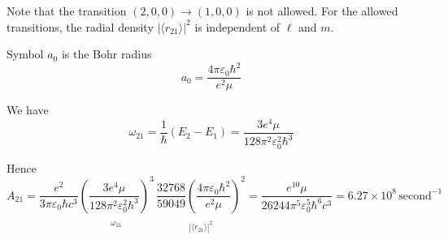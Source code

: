 \documentclass[12pt]{article}
\begin{document}
\bigskip
\noindent
Note that the transition $(2,0,0)\rightarrow(1,0,0)$ is not allowed.
For the allowed transitions, the radial density
$|\langle r_{21}\rangle|^2$ is independent of $\ell$ and $m$.

\bigskip
\noindent
Symbol $a_0$ is the Bohr radius
\begin{equation*}
a_0=\frac{4\pi\varepsilon_0\hbar^2}{e^2\mu}
\end{equation*}

\bigskip
\noindent
We have
\begin{equation*}
\omega_{21}=\frac{1}{\hbar}(E_2-E_1)=\frac{3e^4\mu}{128\pi^2\varepsilon_0^2\hbar^3}
\end{equation*}

\noindent
Hence
\begin{equation*}
A_{21}=\frac{e^2}{3\pi\varepsilon_0\hbar c^3}
\underset{\substack{\\[1ex]\omega_{21}}}
{\left(\frac{3e^4\mu}{128\pi^2\varepsilon_0^2\hbar^3}\right)^3}
\,
\underset{\substack{\\[1ex]|\langle r_{21}\rangle|^2}}
{\frac{32768}{59049}\left(\frac{4\pi\varepsilon_0\hbar^2}{e^2\mu}\right)^2}
=
\frac{e^{10}\mu}{26244\pi^5\varepsilon_0^5\hbar^6 c^3}
=6.27\times10^8\,\text{second}^{-1}
\end{equation*}
\end{document}

